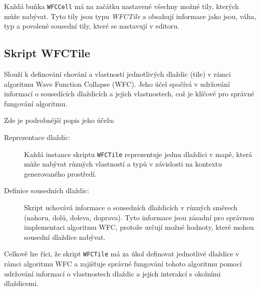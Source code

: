 Každá buňka \texttt{WFCCell} má na začátku nastavené všechny možné tily, kterých může nabývat. Tyto tily jsou typu \textit{WFCTile} a obsahují informace jako jsou, váha, typ a povolené sousední tily, které se nastavují v editoru.

\subsection{Skript WFCTile}

Slouží k definování chování a vlastností jednotlivých dlaždic (tile) v rámci algoritmu Wave Function Collapse (WFC). Jeho účel spočívá v udržování informací o sousedících dlaždicích a jejich vlastnostech, což je klíčové pro správné fungování algoritmu.

Zde je podrobnější popis jeho účelu:

\begin{description}
	\item [Reprezentace dlaždic:] Každá instance skriptu \texttt{WFCTile} reprezentuje jednu dlaždici v mapě, která může nabývat různých vlastností a typů v závislosti na kontextu generovaného prostředí.
	
	\item [Definice sousedních dlaždic:] Skript uchovává informace o sousedních dlaždicích v různých směrech (nahoru, dolů, doleva, doprava). Tyto informace jsou zásadní pro správnou implementaci algoritmu WFC, protože určují možné hodnoty, které mohou sousední dlaždice nabývat.
\end{description}

Celkově lze říci, že skript \texttt{WFCTile} má za úkol definovat jednotlivé dlaždice v rámci algoritmu WFC a zajišťuje správné fungování tohoto algoritmu pomocí udržování informací o vlastnostech dlaždic a jejich interakcí s okolními dlaždicemi.

